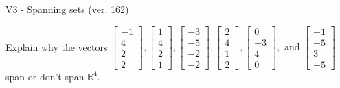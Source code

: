 \begin{exercise}
  \begin{exerciseTitle}V3 - Spanning sets (ver. 162)\end{exerciseTitle}
  \begin{exerciseStatement}
    Explain why the vectors \(\left[\begin{array}{r}
-1 \\
4 \\
2 \\
2
\end{array}\right] , \left[\begin{array}{r}
1 \\
4 \\
2 \\
1
\end{array}\right] , \left[\begin{array}{r}
-3 \\
-5 \\
-2 \\
-2
\end{array}\right] , \left[\begin{array}{r}
2 \\
4 \\
1 \\
2
\end{array}\right] , \left[\begin{array}{r}
0 \\
-3 \\
4 \\
0
\end{array}\right] , \text{ and } \left[\begin{array}{r}
-1 \\
-5 \\
3 \\
-5
\end{array}\right]\) span or don't span \(\mathbb{R}^4\). 
	



\end{exerciseStatement}
\end{exercise}
